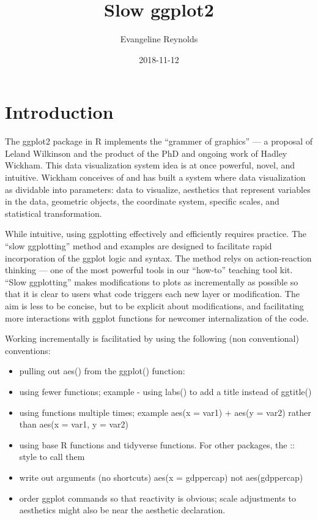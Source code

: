 \documentclass[]{book}
\title{Slow ggplot2}
\author{Evangeline Reynolds}
\date{2018-11-12}
\theoremstyle{definition}
\theoremstyle{definition}
\theoremstyle{definition}
\theoremstyle{remark}
\begin{document}
\maketitle

{
\setcounter{tocdepth}{1}
\tableofcontents
}
\chapter{Introduction}\label{intro}

The ggplot2 package in R implements the ``grammer of graphics'' --- a
proposal of Leland Wilkinson and the product of the PhD and ongoing work
of Hadley Wickham. This data visualization system idea is at once
powerful, novel, and intuitive. Wickham conceives of and has built a
system where data visualization as dividable into parameters: data to
visualize, aesthetics that represent variables in the data, geometric
objects, the coordinate system, specific scales, and statistical
transformation.

While intuitive, using ggplotting effectively and efficiently requires
practice. The ``slow ggplotting'' method and examples are designed to
facilitate rapid incorporation of the ggplot logic and syntax. The
method relys on action-reaction thinking --- one of the most powerful
tools in our ``how-to'' teaching tool kit. ``Slow ggplotting'' makes
modifications to plots as incrementally as possible so that it is clear
to users what code triggers each new layer or modification. The aim is
less to be concise, but to be explicit about modifications, and
facilitating more interactions with ggplot functions for newcomer
internalization of the code.

Working incrementally is facilitatied by using the following (non
conventional) conventions:

\begin{itemize}
\item
  pulling out aes() from the ggplot() function:
\item
  using fewer functions; example - using labs() to add a title instead
  of ggtitle()
\item
  using functions multiple times; example aes(x = var1) + aes(y = var2)
  rather than aes(x = var1, y = var2)
\item
  using base R functions and tidyverse functions. For other packages,
  the :: style to call them
\item
  write out arguments (no shortcuts) aes(x = gdppercap) not
  aes(gdppercap)
\item
  order ggplot commands so that reactivity is obvious; scale adjustments
  to aesthetics might also be near the aesthetic declaration.
\end{itemize}
\end{document}
